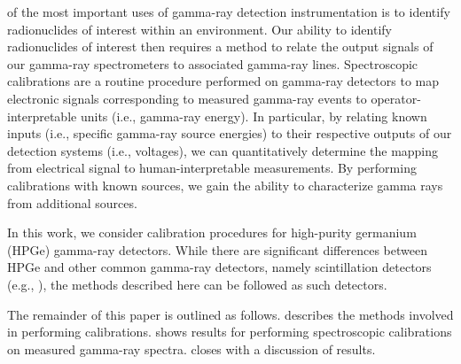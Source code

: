  of the most important uses of gamma-ray detection instrumentation is to identify radionuclides of interest within an environment.
Our ability to identify radionuclides of interest then requires a method to relate the output signals of our gamma-ray spectrometers to associated gamma-ray lines.
Spectroscopic calibrations are a routine procedure performed on gamma-ray detectors to map electronic signals corresponding to measured gamma-ray events to operator-interpretable units (i.e., gamma-ray energy).
In particular, by relating known inputs (i.e., specific gamma-ray source energies) to their respective outputs of our detection systems (i.e., voltages), we can quantitatively determine the mapping from electrical signal to human-interpretable measurements.
By performing calibrations with known sources, we gain the ability to characterize gamma rays from additional sources.

In this work, we consider calibration procedures for high-purity germanium (HPGe) gamma-ray detectors.
While there are significant differences between HPGe and other common gamma-ray detectors, namely scintillation detectors (e.g., ), the methods described here can be followed as such detectors.

The remainder of this paper is outlined as follows.
 describes the methods involved in performing calibrations.
 shows results for performing spectroscopic calibrations on measured gamma-ray spectra.
 closes with a discussion of results.

